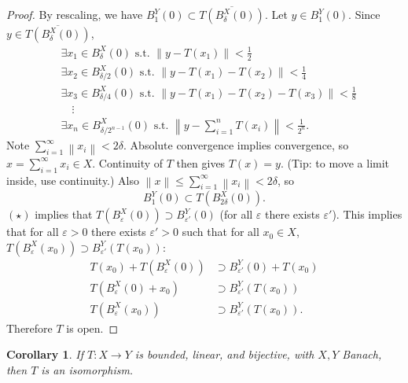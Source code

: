 \documentclass[12pt]{article}
\newcommand{\norm}[1]{\left\| #1 \right\|}
\newtheorem{cor}[thm]{Corollary}
\theoremstyle{definition}
\begin{document}
\begin{proof}
	By rescaling, we have $B_1^Y(0) \subset \overline{T(B_\delta^X(0))}$.
	Let $y \in B_1^Y(0)$.
	Since $y \in \overline{T(B_\delta^X(0))}$,
	\begin{align*}
		&\exists x_1 \in B_\delta^X(0) \text{ s.t. } \norm{y - T(x_1)} < \tfrac{1}{2} \\
		&\exists x_2 \in B_{\delta/2}^X(0) \text{ s.t. } \norm{y - T(x_1) - T(x_2)} < \tfrac{1}{4} \\
		&\exists x_3 \in B_{\delta/4}^X(0) \text{ s.t. } \norm{y - T(x_1) - T(x_2) - T(x_3)} < \tfrac{1}{8} \\
		&\quad \vdots \\
		&\exists x_n \in B_{\delta/2^{n-1}}^X(0) \text{ s.t. } \norm{y - \sum_{i=1}^n T(x_i)} < \tfrac{1}{2^n}.
	\end{align*}
	Note $\sum_{i=1}^\infty \norm{x_i} < 2\delta$.
	Absolute convergence implies convergence, so $x = \sum_{i=1}^\infty x_i \in X$.
	Continuity of $T$ then gives $T(x) = y$.
	(Tip: to move a limit inside, use continuity.)
	Also $\norm{x} \leq \sum_{i=1}^\infty \norm{x_i} < 2\delta$, so
	\begin{equation*}
		B_1^Y(0) \subset T(B_{2\delta}^X(0)). \tag{$\star$}
	\end{equation*}
	$(\star)$ implies that $T(B_\varepsilon^X(0)) \supset B_{\varepsilon'}^Y(0)$ (for all $\varepsilon$ there exists $\varepsilon'$).
	This implies that for all $\varepsilon > 0$ there exists $\varepsilon' > 0$ such that for all $x_0 \in X$, $T(B_\varepsilon^X(x_0)) \supset B_{\varepsilon'}^Y(T(x_0))$:
	\begin{align*}
		T(x_0) + T(B_\varepsilon^X(0)) &\supset B_{\varepsilon'}^Y(0) + T(x_0) \\
		T(B_\varepsilon^X(0) + x_0) &\supset B_{\varepsilon'}^Y(T(x_0)) \\
		T(B_\varepsilon^X(x_0)) &\supset B_{\varepsilon'}^Y(T(x_0)).
	\end{align*}
	Therefore $T$ is open.
\end{proof}

\begin{cor}
	If $T : X \to Y$ is bounded, linear, and bijective, with $X, Y$ Banach, then $T$ is an isomorphism.
\end{cor}
\end{document}
